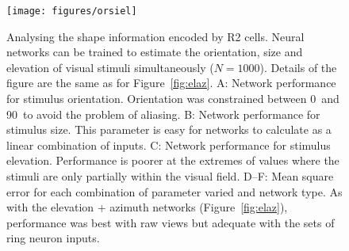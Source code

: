 \begin{figure}
\centering
\texttt{[image: figures/orsiel]}
\caption{Analysing the shape information encoded by R2 cells.
Neural networks can be trained to estimate the orientation, size and elevation of visual stimuli simultaneously ($N=1000$).
Details of the figure are the same as for Figure~\ref{fig:elaz}.
A: Network performance for stimulus orientation.
Orientation was constrained between 0\degree\ and 90\degree\ to avoid the problem of aliasing.
B: Network performance for stimulus size.
This parameter is easy for networks to calculate as a linear combination of inputs.
C: Network performance for stimulus elevation.
Performance is poorer at the extremes of values where the stimuli are only partially within the visual field.
D--F: Mean square error for each combination of parameter varied and network type.
As with the elevation + azimuth networks (Figure~\ref{fig:elaz}), performance was best with raw views but adequate with the sets of ring neuron inputs.
}
\label{fig:orsiel}
\end{figure}
